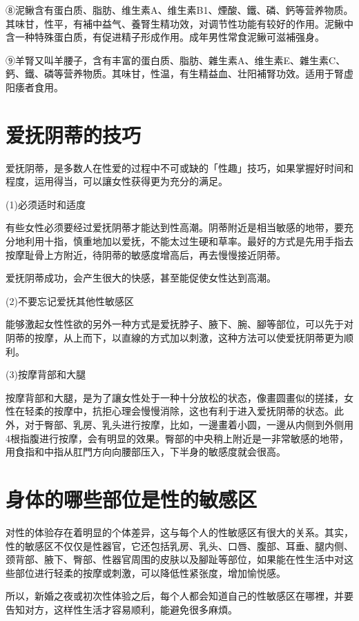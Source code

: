 \documentclass[12pt,UTF8]{ctexbook}
\begin{document}
⑧泥鳅含有蛋白质、脂肪、维生素A、维生素B1、煙酸、鐵、磷、鈣等营养物质。其味甘，性平，有補中益气、養腎生精功效，对调节性功能有较好的作用。泥鳅中含一种特殊蛋白质，有促进精子形成作用。成年男性常食泥鳅可滋補强身。

⑨羊腎又叫羊腰子，含有丰富的蛋白质、脂肪、雜生素A、维生素E、雜生素C、鈣、鐵、磷等营养物质。其味甘，性温，有生精益血、壮阳補腎功效。适用于腎虚阳痿者食用。

\section{爱抚阴蒂的技巧}

爱抚阴蒂，是多数人在性爱的过程中不可或缺的「性趣」技巧，如果掌握好时间和程度，运用得当，可以讓女性获得更为充分的满足。

(1)必须适时和适度

有些女性必须要经过爱抚阴蒂才能达到性高潮。阴蒂附近是相当敏感的地带，要充分地利用十指，慎重地加以爱抚，不能太过生硬和草率。最好的方式是先用手指去按摩耻骨上方附近，待阴蒂的敏感度增高后，再去慢慢接近阴蒂。

爱抚阴蒂成功，会产生很大的快感，甚至能促使女性达到高潮。

(2)不要忘记爱抚其他性敏感区

能够激起女性性欲的另外一种方式是爱抚脖子、腋下、腕、腳等部位，可以先于对阴蒂的按摩，从上而下，以直線的方式加以刺激，这种方法可以使爱抚阴蒂更为顺利。

(3)按摩背部和大腿

按摩背部和大腿，是为了讓女性处于一种十分放松的状态，像畫圆畫似的搓揉，女性在轻柔的按摩中，抗拒心理会慢慢消除，这也有利于进入爱抚阴蒂的状态。此外，对于臀部、乳房、乳头进行按摩，比如，一邊畫着小圆，一邊从内侧到外侧用4根指腹进行按摩，会有明显的效果。臀部的中央稍上附近是一非常敏感的地带，用食指和中指从肛門方向向腰部压入，下半身的敏感度就会很高。

\section{身体的哪些部位是性的敏感区}

对性的体验存在着明显的个体差异，这与每个人的性敏感区有很大的关系。其实，性的敏感区不仅仅是性器官，它还包括乳房、乳头、口唇、腹部、耳垂、腿内侧、颈背部、腋下、臀部、性器官周围的皮肤以及腳趾等部位，如果能在性生活中对这些部位进行轻柔的按摩或刺激，可以降低性紧张度，增加愉悦感。

所以，新婚之夜或初次性体验之后，每个人都会知道自己的性敏感区在哪裡，并要告知对方，这样性生活才容易顺利，能避免很多麻煩。
\end{document}
